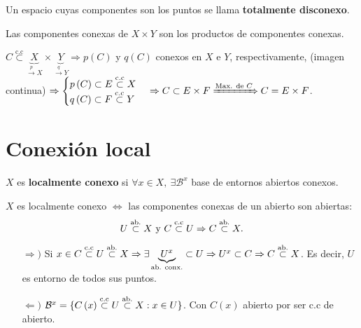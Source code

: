 \begin{defi}
Un espacio cuyas componentes son los puntos se llama \textbf{totalmente disconexo}. 
\end{defi}

\begin{prop}
Las componentes conexas de $X \times Y$ son los productos de componentes conexas.
\end{prop}
\begin{demo}
$C \stackrel{\text{c.c}}{\subset} \underbrace{X}_{\xrightarrow{p} X} \times \underbrace{Y}_{\xrightarrow{q} Y} \Rightarrow p\left( C \right)$ y $q\left( C \right)$ conexos en $X$ e $Y$, respectivamente, (imagen continua) $\Rightarrow \begin{cases}
    p\left( C \right) \subset E \stackrel{\text{c.c}}{\subset}  X\\
    q\left( C \right) \subset F \stackrel{\text{c.c}}{\subset}  Y
\end{cases} \Rightarrow C \subset E \times F \xRightarrow{\text{Max. de } C} C = E\times F$.
\end{demo}

\section{Conexión local}%
\label{sec:conexion_local}
\begin{defi}
$X$ es \textbf{localmente conexo}  si $\forall x \in X,\ \exists \mathcal{B}^x$ base de entornos abiertos conexos.
\end{defi}

\begin{prop}
$X$ es localmente conexo $\Leftrightarrow$ las componentes conexas de un abierto son abiertas:
\[
U \stackrel{\text{ab.}}{\subset} X \text{ y } C \stackrel{\text{c.c}}{\subset} U \Rightarrow C \stackrel{\text{ab.}}{\subset} X.
\]
\end{prop}
\begin{demo}
\begin{itemize}
    \item[$\Rightarrow)$] Si $x \in C \stackrel{\text{c.c}}{\subset} U \stackrel{\text{ab.}}{\subset} X \Rightarrow \exists \underbrace{U^x}_{\text{ab. conx.}} \subset U \Rightarrow U^x \subset C \Rightarrow C \stackrel{\text{ab.}}{\subset} X$. Es decir, $U$ es entorno de todos sus puntos.
    \item[$\Leftarrow)$] $ \mathcal{B}^x = \{C\left( x \right) \stackrel{\text{c.c}}{\subset} U \stackrel{\text{ab.}}{\subset} X : x \in U\}$. Con $C\left( x \right)$ abierto por ser c.c de abierto.
\end{itemize}
\end{demo}

